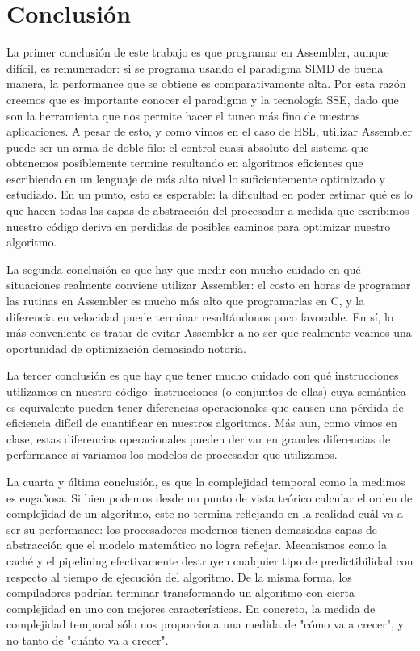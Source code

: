 \section{Conclusión}

La primer conclusión de este trabajo es que programar en Assembler, aunque difícil, es remunerador: si se programa usando el paradigma SIMD de buena manera, la performance que se obtiene es comparativamente alta. Por esta razón creemos que es importante conocer el paradigma y la tecnología SSE, dado que son la herramienta que nos permite hacer el tuneo más fino de nuestras aplicaciones. A pesar de esto, y como vimos en el caso de HSL, utilizar Assembler puede ser un arma de doble filo: el control cuasi-absoluto del sistema que obtenemos posiblemente termine resultando en algoritmos eficientes que escribiendo en un lenguaje de más alto nivel lo suficientemente optimizado y estudiado. En un punto, esto es esperable: la dificultad en poder estimar qué es lo que hacen todas las capas de abstracción del procesador a medida que escribimos nuestro código deriva en perdidas de posibles caminos para optimizar nuestro algoritmo.

La segunda conclusión es que hay que medir con mucho cuidado en qué situaciones realmente conviene utilizar Assembler: el costo en horas de programar las rutinas en Assembler es mucho más alto que programarlas en C, y la diferencia en velocidad puede terminar resultándonos poco favorable. En sí, lo más conveniente es tratar de evitar Assembler a no ser que realmente veamos una oportunidad de optimización demasiado notoria.

La tercer conclusión es que hay que tener mucho cuidado con qué instrucciones utilizamos en nuestro código: instrucciones (o conjuntos de ellas) cuya semántica es equivalente pueden tener diferencias operacionales que causen una pérdida de eficiencia difícil de cuantificar en nuestros algoritmos. Más aun, como vimos en clase, estas diferencias operacionales pueden derivar en grandes diferencias de performance si variamos los modelos de procesador que utilizamos.

La cuarta  y última conclusión, es que la complejidad temporal como la medimos es engañosa. Si bien podemos desde un punto de vista teórico calcular el orden de complejidad de un algoritmo, este no termina reflejando en la realidad cuál va a ser su performance: los procesadores modernos tienen demasiadas capas de abstracción que el modelo matemático no logra reflejar. Mecanismos como la caché y el pipelining efectivamente destruyen cualquier tipo de predictibilidad con respecto al tiempo de ejecución del algoritmo. De la misma forma, los compiladores podrían terminar transformando un algoritmo con cierta complejidad en uno con mejores características. En concreto, la medida de complejidad temporal sólo nos proporciona una medida de "cómo va a crecer", y no tanto de "cuánto va a crecer". 
